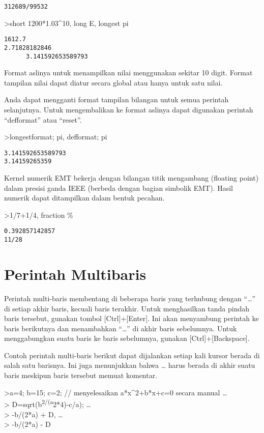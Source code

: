 \documentclass[
]{book}
\begin{document}
\begin{verbatim}
312689/99532
\end{verbatim}

\textgreater short 1200*1.03\^{}10, long E, longest pi

\begin{verbatim}
1612.7
2.71828182846
      3.141592653589793 
\end{verbatim}

Format aslinya untuk menampilkan nilai menggunakan sekitar 10 digit. Format tampilan nilai dapat diatur secara global atau hanya untuk satu nilai.

Anda dapat mengganti format tampilan bilangan untuk semua perintah selanjutnya. Untuk mengembalikan ke format aslinya dapat digunakan perintah ``defformat'' atau ``reset''.

\textgreater longestformat; pi, defformat; pi

\begin{verbatim}
3.141592653589793
3.14159265359
\end{verbatim}

Kernel numerik EMT bekerja dengan bilangan titik mengambang (floating point) dalam presisi ganda IEEE (berbeda dengan bagian simbolik EMT). Hasil numerik dapat ditampilkan dalam bentuk pecahan.

\textgreater1/7+1/4, fraction \%

\begin{verbatim}
0.392857142857
11/28
\end{verbatim}

\chapter{Perintah Multibaris}\label{perintah-multibaris}

Perintah multi-baris membentang di beberapa baris yang terhubung dengan ``\ldots{}'' di setiap akhir baris, kecuali baris terakhir. Untuk menghasilkan tanda pindah baris tersebut, gunakan tombol {[}Ctrl{]}+{[}Enter{]}. Ini akan menyambung perintah ke baris berikutnya dan menambahkan ``\ldots{}'' di akhir baris sebelumnya. Untuk menggabungkan suatu baris ke baris sebelumnya, gunakan {[}Ctrl{]}+{[}Backspace{]}.

Contoh perintah multi-baris berikut dapat dijalankan setiap kali kursor berada di salah satu barisnya. Ini juga menunjukkan bahwa \ldots{} harus berada di akhir suatu baris meskipun baris tersebut memuat komentar.

\textgreater a=4; b=15; c=2; // menyelesaikan a*x\^{}2+b*x+c=0 secara manual \ldots{}\\
\textgreater{} D=sqrt(b\textsuperscript{2/(a}2*4)-c/a); \ldots{}\\
\textgreater{} -b/(2*a) + D, \ldots{}\\
\textgreater{} -b/(2*a) - D
\end{document}
